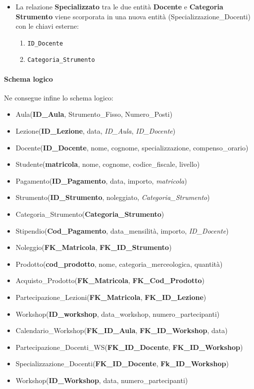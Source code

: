 \begin{itemize}
    \begin{enumerate}
        \item \texttt{ID\_Docente} 
        \item \texttt{ID\_Workshop}
    \end{enumerate}
    \item La relazione \textbf{Specializzato} tra le due entità \textbf{Docente} e \textbf{Categoria Strumento} viene scorporata in una nuova entità (Specializzazione\_Docenti) con le chiavi esterne: 
    \begin{enumerate}
        \item \texttt{ID\_Docente}
        \item \texttt{Categoria\_Strumento}
    \end{enumerate}
\end{itemize}
\paragraph{Schema logico} Ne consegue infine lo schema logico:
\begin{itemize}
    \item Aula(\textbf{ID\_Aula}, Strumento\_Fisso, Numero\_Posti)
    \item Lezione(\textbf{ID\_Lezione}, data, \textit{ID\_Aula}, \textit{ID\_Docente})
    \item Docente(\textbf{ID\_Docente}, nome, cognome, specializzazione, compenso\_orario)
    \item Studente(\textbf{matricola}, nome, cognome, codice\_fiscale, livello)
    \item Pagamento(\textbf{ID\_Pagamento}, data, importo, \textit{matricola})
    \item Strumento(\textbf{ID\_Strumento}, noleggiato, \textit{Categoria\_Strumento})
    \item Categoria\_Strumento(\textbf{Categoria\_Strumento}) 
    \item Stipendio(\textbf{Cod\_Pagamento}, data\_mensilità, importo, \textit{ID\_Docente}) 
    \item Noleggio(\textbf{FK\_Matricola}, \textbf{FK\_ID\_Strumento})
    \item Prodotto(\textbf{cod\_prodotto}, nome, categoria\_merceologica, \newline quantità)
    \item Acquisto\_Prodotto(\textbf{FK\_Matricola}, \textbf{FK\_Cod\_Prodotto}) 
    \item Partecipazione\_Lezioni(\textbf{FK\_Matricola}, \textbf{FK\_ID\_Lezione}) 
    \newpage
    \item Workshop(\textbf{ID\_workshop}, data\_workshop, numero\_partecipanti)
    \item Calendario\_Workshop(\textbf{FK\_ID\_Aula}, \textbf{FK\_ID\_Workshop}, \newline data)
    \item Partecipazione\_Docenti\_WS(\textbf{FK\_ID\_Docente}, \textbf{FK\_ID\_Workshop})
    \item Specializzazione\_Docenti(\textbf{FK\_ID\_Docente}, \textbf{Fk\_ID\_Workshop})
    \item Workshop(\textbf{ID\_Workshop}, data, numero\_partecipanti) 
\end{itemize}
